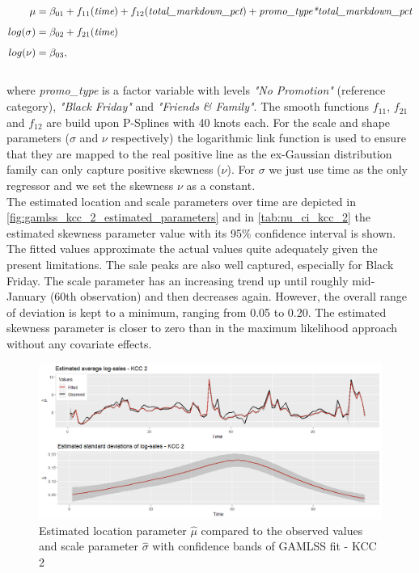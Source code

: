 \begin{equation}
\begin{aligned}
\mu &= \beta_{01} + f_{11}(\textit{time}) + f_{12}(\textit{total\_markdown\_pct}) + \textit{promo\_type*total\_markdown\_pct} \\ \noalign{\vskip5pt}
log(\sigma) &= \beta_{02} + f_{21}(\textit{time}) \\ \noalign{\vskip5pt}
log(\nu) &=  \beta_{03}, 
\end{aligned}
\label{eq:gamlss_kcc_2}
\end{equation} \\
where \textit{promo\_type} is a factor variable with levels \textit{"No Promotion"} (reference category), \textit{"Black Friday"} and \textit{"Friends \& Family"}. The smooth functions $f_{11}$, $f_{21}$ and $f_{12}$ are build upon P-Splines with 40 knots each. For the scale and shape parameters ($\sigma$ and $\nu$ respectively) the logarithmic link function is used to ensure that they are mapped to the real positive line as the ex-Gaussian distribution family can only capture positive skewness ($\nu$). For $\sigma$ we just use time as the only regressor and we set the skewness $\nu$ as a constant.\\
 The estimated location and scale parameters over time are depicted in \autoref{fig:gamlss_kcc_2_estimated_parameters} and in \autoref{tab:nu_ci_kcc_2} the estimated skewness parameter value with its 95\% confidence interval is shown. The fitted values approximate the actual values quite adequately given the present limitations. The sale peaks are also well captured, especially for Black Friday. The scale parameter has an increasing trend up until roughly mid-January (60th observation) and then decreases again. However, the overall range of deviation is kept to a minimum, ranging from 0.05 to 0.20. The estimated skewness parameter is closer to zero than in the maximum likelihood approach without any covariate effects.
\\


\begin{figure}[H]
\centering
  \includegraphics[width=0.95\linewidth]{figures/gamlss_kcc_2_estimated_parameters.png}
  \caption{Estimated location parameter $\hat{\mu}$ compared to the observed values and scale parameter $\hat{\sigma}$ with confidence bands of GAMLSS fit - KCC 2}
  \label{fig:gamlss_kcc_2_estimated_parameters}
\end{figure}





